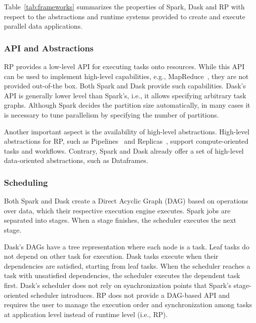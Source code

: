 Table~\ref{tab:frameworks} summarizes the properties of Spark, Dask and
RP with respect to the abstractions and runtime systems provided to
create and execute parallel data applications.

\subsubsection*{API and Abstractions}

RP provides a low-level API for executing tasks onto resources. While
this API can be used to implement high-level capabilities, e.g.,
MapReduce~\cite{mantha2012pilot}, they are not provided out-of-the box. Both
Spark and Dask provide such capabilities. Dask's API is generally lower level
than Spark's, i.e., it allows specifying arbitrary task graphs. Although Spark
decides the partition size automatically, in many cases it is necessary to tune
parallelism by specifying the number of partitions.

Another important aspect is the availability of high-level abstractions.
High-level abstractions for RP, such as
Pipelines~\cite{balasubramanian2018harnessing} and
Replicas~\cite{dakka2018concurrent}, support compute-oriented
tasks and workflows. Contrary, Spark and Dask already offer a set of
high-level data-oriented abstractions, such as Dataframes.


\subsubsection*{Scheduling}

Both Spark and Dask create a Direct Acyclic Graph (DAG) based on operations over
data, which their respective execution engine executes. Spark jobs are
separated into stages. When a stage finishes, the scheduler executes the
next stage.

Dask's DAGs have a tree representation where each node is a task. Leaf tasks do
not depend on other task for execution. Dask tasks execute when their
dependencies are satisfied, starting from leaf tasks. When the scheduler reaches a task
with unsatisfied dependencies, the scheduler executes the dependent task first.
Dask's scheduler does not rely on synchronization points that Spark's
stage-oriented scheduler introduces. RP does not provide a DAG-based
API and requires the user to manage the execution order and synchronization
among tasks at application level instead of runtime level (i.e., RP).

